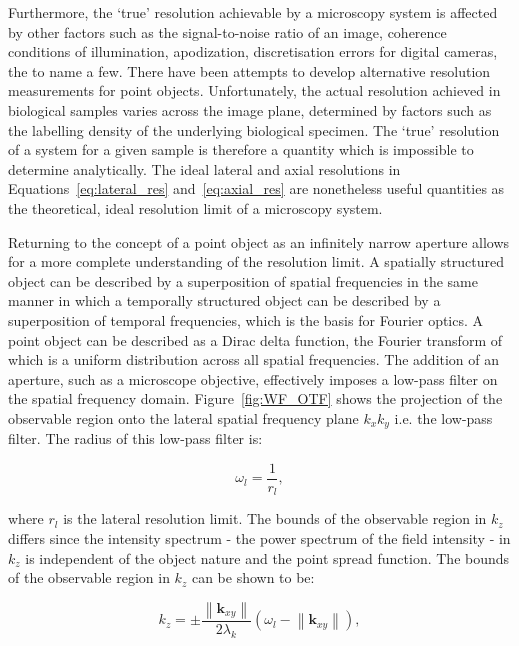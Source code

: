 Furthermore, the `true' resolution achievable by a microscopy system is affected 
by other factors such as the signal-to-noise ratio of an image, coherence 
conditions of illumination, apodization, discretisation errors for digital 
cameras, the to name a few\cite{den1997resolution}. There have been attempts to 
develop alternative resolution measurements for point objects\cite{ram2006beyond}. 
Unfortunately, the actual resolution achieved in biological samples varies 
across the image plane, determined by factors such as the labelling density of 
the underlying biological specimen\cite{culley2017nanoj}. The `true' resolution 
of a system for a given sample is therefore a quantity which is impossible to 
determine analytically. The ideal lateral and axial resolutions in 
Equations~\ref{eq:lateral_res} and~\ref{eq:axial_res} are nonetheless useful
quantities as the theoretical, ideal resolution limit of a microscopy system.

Returning to the concept of a point object as an infinitely narrow aperture allows 
for a more complete understanding of the resolution limit. A spatially structured 
object can be described by a superposition of spatial frequencies in the same 
manner in which a temporally structured object can be described by a superposition 
of temporal frequencies, which is the basis for Fourier 
optics\cite{goodman2005introduction}. A point object can be described as a Dirac
delta function, the Fourier transform of which is a uniform distribution across all
spatial frequencies. The addition of an aperture, such as a microscope objective, 
effectively imposes a low-pass filter on the spatial frequency domain. 
Figure~\ref{fig:WF_OTF} shows the projection of the observable region onto the 
lateral spatial frequency plane $k_{x}k_{y}$ i.e. the low-pass filter. The radius of
this low-pass filter is: 

\begin{equation}\label{eq:lateral_spatial_freq_res}
\omega_{l} = \frac{1}{r_{l}},
\end{equation}

where $r_{l}$ is the lateral resolution limit. The bounds of the observable region 
in $k_{z}$ differs since the intensity spectrum - the power spectrum of the 
field intensity - in $k_{z}$ is independent of the object nature and the point
spread function\cite{frieden1967optical}. The bounds of the observable region in
$k_{z}$ can be shown to be:

\begin{equation}\label{eq:observable_region_kz}
k_{z} = \pm\frac{\left\|\textbf{k}_{xy}\right\|}{2\lambda_{k}}(\omega_{l} - \left\|\textbf{k}_{xy}\right\|),
\end{equation}

